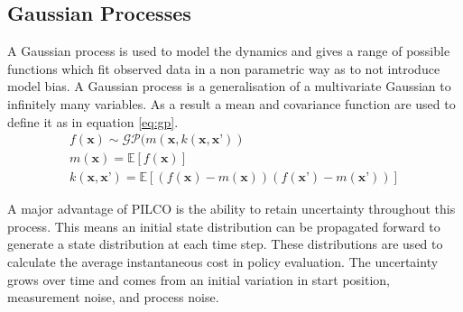 \documentclass[twoside,twocolumn,12pt]{article}
\begin{document}
\subsection{Gaussian Processes}

A Gaussian process is used to model the dynamics and gives a range of possible functions which fit observed data in a non parametric way as to not introduce model bias. A Gaussian process is a generalisation of a multivariate Gaussian to infinitely many variables. As a result a mean and covariance function are used to define it as in equation \ref{eq:gp}.
\begin{equation}\label{eq:gp}
\begin{gathered}
f(\textbf{x}) \sim \mathcal{GP}(m(\textbf{x},k(\textbf{x},\textbf{x'})) \\
m(\textbf{x}) = \mathbb{E}[f(\textbf{x})]  \\
k(\textbf{x},\textbf{x'}) = \mathbb{E}[(f(\textbf{x})-m(\textbf{x}))( f(\textbf{x'})-m(\textbf{x'}))]
\end{gathered}
\end{equation}

A major advantage of PILCO is the ability to retain uncertainty throughout this process. This means an initial state distribution can be propagated forward to generate a state distribution at each time step. These distributions are used to calculate the average instantaneous cost in policy evaluation.
The uncertainty grows over time and comes from an initial variation in start position, measurement noise, and process noise. 
\end{document}
